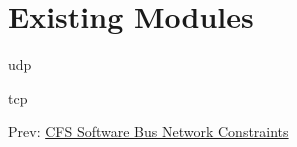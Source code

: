 \section*{Existing Modules }


\begin{DoxyItemize}
\item udp 
\item tcp 
\end{DoxyItemize}

Prev\-: \hyperlink{cfssbncons}{C\-F\-S Software Bus Network Constraints} 